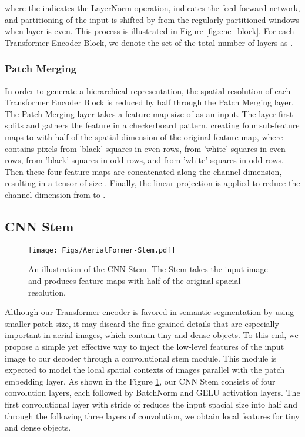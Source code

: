 \documentclass[journal]{IEEEtran}
\begin{document}
where the  indicates the LayerNorm \cite{ba2016layer} operation,  indicates the feed-forward network, and partitioning of the input  is shifted by  from the regularly partitioned windows when layer  is even. This process is illustrated in Figure \ref{fig:enc_block}. For each Transformer Encoder Block, we denote the set of the total number of layers as .







\subsubsection{Patch Merging} In order to generate a hierarchical representation, the spatial resolution of each Transformer Encoder Block is reduced by half through the Patch Merging layer.
The Patch Merging layer takes a feature map size of  as an input. 
The layer first splits and gathers the feature in a checkerboard pattern, creating four sub-feature maps  to  with half of the spatial dimension of the original feature map, where  contains pixels from 'black' squares in even rows,  from 'white' squares in even rows,  from 'black' squares in odd rows, and  from 'white' squares in odd rows. Then these four feature maps are concatenated along the channel dimension, resulting in a tensor of size . Finally, the linear projection is applied to reduce the channel dimension from  to .





\subsection{CNN Stem}

\begin{figure}[!t]
    \centering
    \texttt{[image: Figs/AerialFormer-Stem.pdf]}
    \caption{An illustration of the CNN Stem. The Stem takes the input image and produces feature maps with half of the original spacial resolution.}
    \label{fig:stem}
\end{figure}

Although our Transformer encoder is favored in semantic segmentation by using smaller patch size, it may discard the fine-grained details that are especially important in aerial images, which contain tiny and dense objects. To this end, we propose a simple yet effective way to inject the low-level features of the input image to our decoder through a convolutional stem module. 
This module is expected to model the local spatial contexts of images parallel with the patch embedding layer. As shown in the Figure \ref{fig:stem}, our CNN Stem consists of four convolution layers, each followed by BatchNorm \cite{ioffe2015batch} and GELU \cite{hendrycks2016gaussian} activation layers. The first  convolutional layer with stride of  reduces the input spacial size into half and through the following three layers of convolution, we obtain local features for tiny and dense objects.
\end{document}
